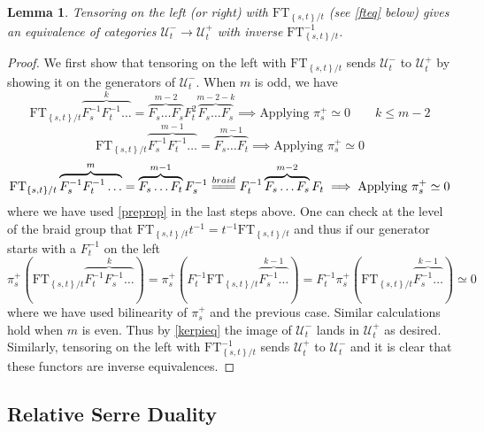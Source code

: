 \documentclass[10pt]{article}
\numberwithin{theorem}{section}
\newtheorem{lemma}[theorem]{Lemma}
\theoremstyle{definition}
\newcommand{\Uc}{\mathcal{U}}
\newcommand{\paren}[1]{\left( #1 \right)}
\newcommand{\set}[1]{\left \{ #1 \right \}}
\newcommand{\ft}{\mathrm{FT}}
\newcommand{\xequals}[1]{\overset{#1}{=\joinrel=\joinrel=}}
\newcommand{\0}{\ \raisebox{-2ex}{\begin{tikzpicture}[xscale=0.25,yscale=0.3,thick,baseline]
 \draw (0,0) -- (0,3); 
\end{tikzpicture}}}
\renewcommand{\1}{\ \raisebox{-2ex}{\begin{tikzpicture}[xscale=0.25,yscale=0.3,thick,baseline]
 \draw (0,0) -- (0,1);
 \draw (0,2) -- (0,3);
 \node[dot] at (0,1) {};
  \node[dot] at (0,2) {};
\end{tikzpicture}}}
\begin{document}
\begin{lemma}
\label{tenequiv}
   Tensoring on the left (or right) with $\ft_{\set{s,t}/t}$ (see \cref{fteq} below) gives an equivalence of categories $\Uc_t^{-}\to \Uc_t^{+}$ with inverse $\ft_{\set{s,t}/t}^{-1}$. 
\end{lemma}
\begin{proof}
    We first show that tensoring on the left with $\ft_{\set{s,t}/t}$ sends $\Uc_t^{-}$ to $\Uc_t^{+}$ by showing it on the generators of $\Uc_t^{-}$. When $m$ is odd, we have
    \[ \ft_{\set{s,t}/t} \overbrace{F_s^{-1}F_t^{-1}\ldots }^{k}= \overbrace{F_s\ldots F_s}^{m-2}F_t^2\overbrace{F_s\ldots F_s}^{m-2-k}\implies  \text{Applying }\pi_s^+ \simeq 0  \qquad k\le m-2   \]
    \[ \ft_{\set{s,t}/t} \overbrace{F_s^{-1}F_t^{-1}\ldots }^{m-1}= \overbrace{F_s\ldots F_t}^{m-1}\implies  \text{Applying }\pi_s^+ \simeq 0\]
    \[ \ft_{\set{s,t}/t} \overbrace{F_s^{-1}F_t^{-1}\ldots }^{m}= \overbrace{F_s\ldots F_t}^{m-1}F_s^{-1}\xequals{braid} F_t^{-1} \overbrace{F_s\ldots F_s}^{m-2} F_t  \implies  \text{Applying }\pi_s^+ \simeq 0 \]
   where we have used \cref{preprop} in the last steps above. One can check at the level of the braid group that $\ft_{\set{s,t}/t} t^{-1}=t^{-1} \ft_{\set{s,t}/t}$ and thus if our generator starts with a $F_t^{-1}$ on the left
\[ \pi_s^+\paren{\ft_{\set{s,t}/t} \overbrace{F_t^{-1}F_s^{-1}\ldots }^{k}}= \pi_s^+\paren{F_t^{-1} \ft_{\set{s,t}/t} \overbrace{F_s^{-1}\ldots }^{k-1}}= F_t^{-1}\pi_s^+\paren{ \ft_{\set{s,t}/t} \overbrace{F_s^{-1}\ldots }^{k-1}}\simeq 0 \]
   where we have used bilinearity of $\pi_s^+$ and the previous case. Similar calculations hold when $m$ is even. Thus by \cref{kerpieq} the image of $\Uc_t^{-}$ lands in $\Uc_t^{+}$ as desired.\\

   Similarly, tensoring on the left with $\ft_{\set{s,t}/t}^{-1}$ sends $\Uc_t^{+}$ to $\Uc_t^{-}$ and it is clear that these functors are inverse equivalences.
\end{proof}

\subsection{Relative Serre Duality}
\end{document}
